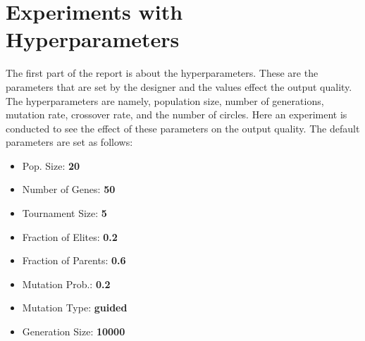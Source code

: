 \documentclass[3p,times,procedia]{elsarticle}
\begin{document}



\enlargethispage{10mm}
\section{\textbf{Experiments with Hyperparameters}}
\label{main}

The first part of the report is about the hyperparameters. These are the parameters that are set by the designer and the values effect the output quality.
The hyperparameters are namely, population size, number of generations, mutation rate, crossover rate, and the number of circles.
Here an experiment is conducted to see the effect of these parameters on the output quality.
The default parameters are set as follows:
\begin{multicols}{3}
    \begin{itemize}
    \item Pop. Size: \textbf{20}
    \item Number of Genes: \textbf{50}  
    \item Tournament Size: \textbf{5}  
    \item Fraction of Elites: \textbf{0.2}
    \item Fraction of Parents: \textbf{0.6}
    \item Mutation Prob.: \textbf{0.2}
    \item Mutation Type: \textbf{guided}
    \item Generation Size: \textbf{10000}
    \end{itemize}
\end{multicols}
\end{document}
